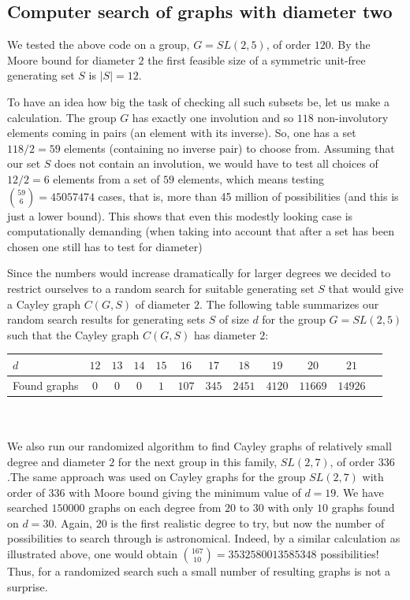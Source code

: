 \documentclass[a4paper,12pt,oneside]{report}%
\begin{document}
\subsection{Computer search of graphs with diameter two}

We tested the above code on a group, $G=SL(2,5)$, of order $120$. By the Moore bound for diameter $2$ the first feasible size of a symmetric unit-free generating set $S$ is $|S|=12$.
 
To have an idea how big the task of checking all such subsets be, let us make a calculation. The group $G$ has exactly one involution and so $118$ non-involutory elements coming in pairs (an element with its inverse). So, one has a set $118/2=59$ elements (containing no inverse pair) to choose from. Assuming that our set $S$ does not contain an involution, we would have to test all choices of $12/2=6$ elements from a set of $59$ elements, which means testing ${59 \choose 6} = 45057474 $ cases, that is, more than 45 million of possibilities (and this is just a lower bound). This shows that even this modestly looking case is computationally demanding (when taking into account that after a set has been chosen one still has to test for diameter)
 
Since the numbers would increase dramatically for larger degrees we decided to restrict ourselves to a random search for suitable generating set $S$ that would give     a Cayley graph $C(G,S)$ of diameter $2$. The following table summarizes our random search results for generating sets $S$ of size $d$ for the group $G=SL(2,5)$ such     that the Cayley graph $C(G,S)$ has diameter $2$: ~ \\
 
\begin{tabular}[htbp]{l*{10}{c}r}
     $d$ & $12$ & $13$ & $14$ & $15$ & $16$ & $17$ & $18$ & $19$ & $20$ & $21$ \\
\hline
     Found graphs & $0$ & $0$  & $0$ & $1$ & $107$ & $345$ & $2451$  & $4120$ & $11669$ & $14926$ \\
\end{tabular} \\ \\

 We also run our randomized algorithm to find Cayley graphs of relatively small degree and diameter $2$ for the next group in this family, $SL(2,7)$, of order $336$.The same approach was used on Cayley graphs for the group $SL(2,7)$ with order of $336$ with Moore bound giving the minimum value of $d=19$. We have searched $150000$ graphs on each degree from $20$ to $30$ with only $10$ graphs found on $d=30$. Again, $20$ is the first realistic degree to try, but now the number of possibilities to search through is astronomical. Indeed, by a similar calculation as illustrated above, one would obtain ${167\choose 10} = 3532580013585348$ possibilities! Thus, for a randomized search such a small number of resulting graphs is not a surprise.
 
\end{document}
